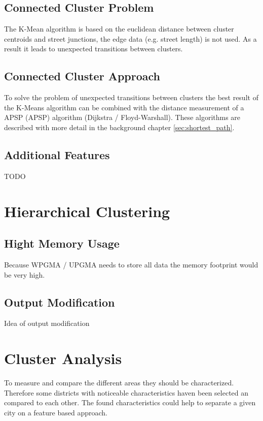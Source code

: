 \subsection{Connected Cluster Problem} \label{sec:kmenasProblem}
The K-Mean algorithm is based on the euclidean distance between cluster centroids and street junctions, the edge data (e.g. street length) is not used. As a result it leads to unexpected transitions between clusters.

\subsection{Connected Cluster Approach} \label{sec:connected_cluster_approach}
To solve the problem of unexpected transitions between clusters the best result of the K-Means algorithm can be combined with the distance measurement of a \acrlong{APSP} (\acrshort{APSP}) algorithm (Dijkstra / Floyd-Warshall). These algorithms are described with more detail in the background chapter \ref{sec:shortest_path}.

\subsection{Additional Features}
TODO

\pagebreak
\section{Hierarchical Clustering}

\subsection{Hight Memory Usage}
Because WPGMA / UPGMA needs to store all data the memory footprint would be very high. %

\subsection{Output Modification}
Idea of output modification

\pagebreak
\section{Cluster Analysis}
To measure and compare the different areas they should be characterized. Therefore some districts with noticeable characteristics haven been selected an compared to each other. The found characteristics could help to separate a given city on a feature based approach.

